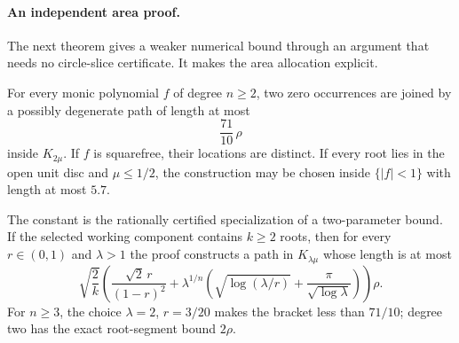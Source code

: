 \documentclass[11pt]{article}
\begin{document}
\paragraph{An independent area proof.}
The next theorem gives a weaker numerical bound through an argument that
needs no circle-slice certificate.  It makes the area allocation explicit.

\begin{theorem}
\label{res:constant-factor-path}
For every monic polynomial $f$ of degree $n\ge2$, two zero occurrences are
joined by a possibly degenerate path of length at most
\[
 \frac{71}{10}\,\rho
\]
inside $K_{2\mu}$.  If $f$ is squarefree, their locations are distinct.
If every root lies in the open unit disc and $\mu\le1/2$, the construction
may be chosen inside $\{|f|<1\}$ with length at most $5.7$.
\end{theorem}

The constant is the rationally certified specialization of a two-parameter
bound.  If the selected working component contains $k\ge2$ roots, then for
every $r\in(0,1)$ and $\lambda>1$ the proof constructs a path in
$K_{\lambda\mu}$ whose length is at most
\[
 \sqrt{\frac2k}\left(
   \frac{\sqrt2\,r}{(1-r)^2}
   +\lambda^{1/n}\left(
      \sqrt{\log(\lambda/r)}+
      \frac{\pi}{\sqrt{\log\lambda}}
    \right)
 \right)\rho.                                      \tag{CF}
\]
For $n\ge3$, the choice $\lambda=2$, $r=3/20$ makes the bracket less
than $71/10$; degree two has the exact root-segment bound $2\rho$.
\end{document}

